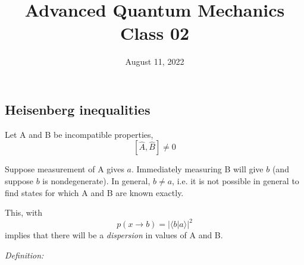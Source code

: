 \documentclass[12pt]{article}
\title{Advanced Quantum Mechanics\\Class 02}
\date{August 11, 2022}                                           %
\begin{document}
\maketitle

\setcounter{section}{3}
\setcounter{equation}{15}


\subsection{Heisenberg inequalities}

Let A and B be incompatible properties,
\[
[\hat{A}, \hat{B}] \neq 0
\]

Suppose measurement of A gives $a$. Immediately
measuring B will give $b$ (and suppose $b$ is nondegenerate). 
In general, $b \neq a$, i.e.
it is not possible in general to find states for which A and B are known exactly. 


This, with
\[
p(x \rightarrow b)=|\langle b | a\rangle|^{2}
\]
implies that there will be a \emph{dispersion} in values of A and B.

\emph{Definition:}
\end{document}
